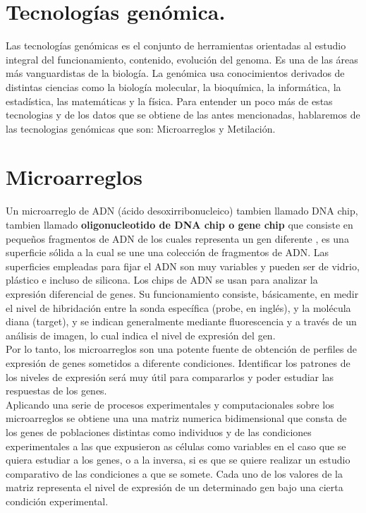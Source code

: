 \documentclass[12pt,letterpaper]{article}
\begin{document}
\section{Tecnologías genómica.}
Las tecnologías genómicas es el conjunto de herramientas orientadas al estudio integral del funcionamiento, contenido,  evolución del genoma. Es una de las áreas más vanguardistas de la biología. La genómica usa conocimientos derivados de distintas ciencias como la biología molecular, la bioquímica, la informática, la estadística, las matemáticas y la física.
Para entender un poco más de estas tecnologias y de los datos que se obtiene de las antes mencionadas, hablaremos de las tecnologias genómicas que son: Microarreglos y Metilación.
\section{Microarreglos}
Un microarreglo de ADN (ácido desoxirribonucleico) tambien llamado DNA chip, tambien llamado \textbf{oligonucleotido de DNA chip o gene chip} que consiste en pequeños fragmentos de ADN de los cuales representa un gen diferente \cite{VallinPlous2007}, es una superficie sólida a la cual se une una colección de fragmentos de ADN. Las superficies empleadas para fijar el ADN son muy variables y pueden ser de vidrio, plástico e incluso de silicona. Los chips de ADN se usan para analizar la expresión diferencial de genes.  Su funcionamiento consiste, básicamente, en medir el nivel de hibridación entre la sonda específica (probe, en inglés), y la molécula diana (target), y se indican generalmente mediante fluorescencia y a través de un análisis de imagen, lo cual indica el nivel de expresión del gen.	\\
Por lo tanto, los microarreglos son una potente fuente de obtención de perfiles de expresión de genes sometidos a diferente condiciones. Identificar los patrones de los niveles de expresión será muy útil para compararlos y poder estudiar las respuestas de los genes. \\
Aplicando una serie de procesos experimentales y computacionales sobre los microarreglos se obtiene una una matriz numerica bidimensional que consta de los genes de poblaciones distintas como individuos y de las condiciones experimentales a las que expusieron as células como variables en el caso que se quiera estudiar a los genes, o a la inversa, si es que se quiere realizar un estudio comparativo de las condiciones a que se somete. Cada uno de los valores de la matriz representa el nivel de expresión de un determinado gen bajo una cierta condición experimental.
\end{document}
